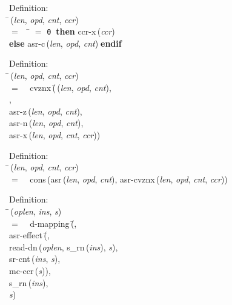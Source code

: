 \begin{tabbing}{\sc Definition}: \\  
\=\,({\it{len\/}}, {\it{opd\/}}, {\it{cnt\/}}, {\it{ccr\/}}) \\ 
$=$$\;\;\;\;$\= $=$ {\tt{0}}$\;\;${\bf then }{\rm{ccr-x}}\,({\it{ccr\/}}) \\ 
{\bf else }{\rm{asr-c}}\,({\it{len\/}}, {\it{opd\/}}, {\it{cnt\/}})$\;${\bf  endif}\-\-
\end{tabbing}

\begin{tabbing}{\sc Definition}: \\  
\=\,({\it{len\/}}, {\it{opd\/}}, {\it{cnt\/}}, {\it{ccr\/}}) \\ 
$=$$\;\;\;\;${\rm{cvznx}}\,(\=\,({\it{len\/}}, {\it{opd\/}}, {\it{cnt\/}}), \\ 
{}, \\ 
{\rm{asr-z}}\,({\it{len\/}}, {\it{opd\/}}, {\it{cnt\/}}), \\ 
{\rm{asr-n}}\,({\it{len\/}}, {\it{opd\/}}, {\it{cnt\/}}), \\ 
{\rm{asr-x}}\,({\it{len\/}}, {\it{opd\/}}, {\it{cnt\/}}, {\it{ccr\/}}))\-\-
\end{tabbing}

\begin{tabbing}{\sc Definition}: \\  
\=\,({\it{len\/}}, {\it{opd\/}}, {\it{cnt\/}}, {\it{ccr\/}}) \\ 
$=$$\;\;\;\;${\rm{cons}}\,({\rm{asr}}\,({\it{len\/}}, {\it{opd\/}}, {\it{cnt\/}}), {\rm{asr-cvznx}}\,({\it{len\/}}, {\it{opd\/}}, {\it{cnt\/}}, {\it{ccr\/}}))\-
\end{tabbing}

\begin{tabbing}{\sc Definition}: \\  
\=\,({\it{oplen\/}}, {\it{ins\/}}, {\it{s\/}}) \\ 
$=$$\;\;\;\;${\rm{d-mapping}}\,(\=, \\ 
{\rm{asr-effect}}\,(\=, \\ 
{\rm{read-dn}}\,({\it{oplen\/}}, {\rm{s\_rn}}\,({\it{ins\/}}), {\it{s\/}}), \\ 
{\rm{sr-cnt}}\,({\it{ins\/}}, {\it{s\/}}), \\ 
{\rm{mc-ccr}}\,({\it{s\/}}))\-, \\ 
{\rm{s\_rn}}\,({\it{ins\/}}), \\ 
{\it{s\/}})\-\-
\end{tabbing}


